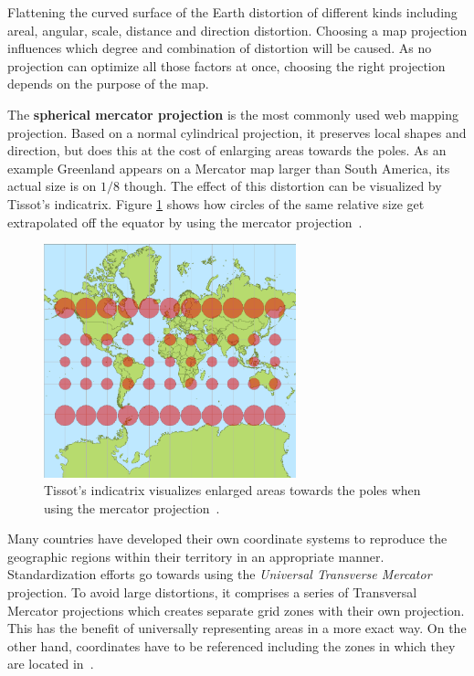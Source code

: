 Flattening the curved surface of the Earth distortion of different kinds including areal, angular, scale, distance and direction distortion. Choosing a map projection influences which degree and combination of distortion will be caused. As no projection can optimize all those factors at once, choosing the right projection depends on the purpose of the map.

The \textbf{spherical mercator projection} is the most commonly used web mapping projection. Based on a normal cylindrical projection, it preserves local shapes and direction, but does this at the cost of enlarging areas towards the poles. As an example Greenland appears on a Mercator map larger than South America, its actual size is on $1/8$ though. The effect of this distortion can be visualized by Tissot's indicatrix. Figure \ref{fig:mercator} shows how circles of the same relative size get extrapolated off the equator by using the mercator projection~\cite{Zzolo11mappingdrupal, wiki:web-mapping, Kupper2005lbs}. 

\begin{figure}[h]
  \begin{center}
    \includegraphics[width=0.65\textwidth]{figures/tissot_mercator.png}
    \caption{Tissot's indicatrix visualizes enlarged areas towards the poles when using the mercator projection~\cite{wiki:mercator}.}
    \label{fig:mercator}
  \end{center}
\end{figure}

Many countries have developed their own coordinate systems to reproduce the geographic regions within their territory in an appropriate manner. Standardization efforts go towards using the \textit{Universal Transverse Mercator} projection. To avoid large distortions, it comprises a series of Transversal Mercator projections which creates separate grid zones with their own projection. This has the benefit of universally representing areas in a more exact way. On the other hand, coordinates have to be referenced including the zones in which they are located in~\cite{Kupper2005lbs}.


